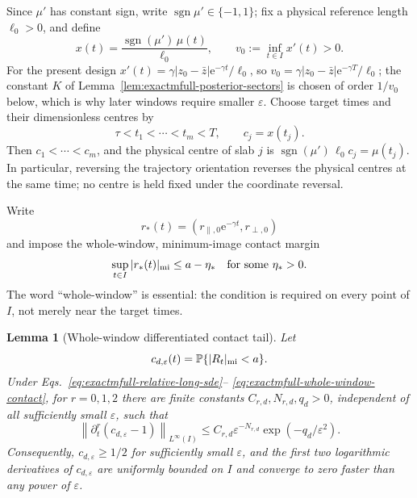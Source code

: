 \documentclass[aps,physrev,onecolumn,amsmath,amssymb,longbibliography]{revtex4-2}
\newcommand{\e}{\mathrm e}
\newtheorem{lemma}[theorem]{Lemma}
\begin{document}
Since \(\mu'\) has constant sign, write \(\operatorname{sgn}\mu'\in\{-1,1\}\);
fix a physical reference length \(\ell_0>0\), and define
\begin{equation}
 x(t)=\frac{\operatorname{sgn}(\mu')\,\mu(t)}{\ell_0},
 \qquad v_0:=\inf_{t\in I}x'(t)>0.
 \label{eq:exactmfull-increasing-coordinate}
\end{equation}
For the present design \(x'(t)=\gamma|z_0-\bar z|\e^{-\gamma t}/\ell_0\), so
\(v_0=\gamma|z_0-\bar z|\e^{-\gamma T}/\ell_0\); the constant \(K\) of
Lemma~\ref{lem:exactmfull-posterior-sectors} is chosen of order \(1/v_0\)
below, which is why later windows require smaller \(\varepsilon\).
Choose target times and their dimensionless centres by
\begin{equation}
 \tau<t_1<\cdots<t_m<T,
 \qquad c_j=x(t_j).
 \label{eq:exactmfull-targets}
\end{equation}
Then \(c_1<\cdots<c_m\), and the physical centre of slab \(j\) is
\(\operatorname{sgn}(\mu')\,\ell_0c_j=\mu(t_j)\).  In particular, reversing the trajectory
orientation reverses the physical centres at the same time; no centre is
held fixed under the coordinate reversal.

Write
\begin{equation}
 r_*(t)=(r_{\parallel,0}\e^{-\gamma t},r_{\perp,0})
 \label{eq:exactmfull-relative-deterministic-path}
\end{equation}
and impose the whole-window, minimum-image contact margin
\begin{equation}
 \sup_{t\in I}|r_*(t)|_{\rm mi}\le a-\eta_*
 \quad\text{for some }\eta_*>0.
 \label{eq:exactmfull-whole-window-contact}
\end{equation}
The word ``whole-window'' is essential: the condition is required on every
point of \(I\), not merely near the target times.

\begin{lemma}[Whole-window differentiated contact tail]
\label{lem:exactmfull-contact-tail}
Let
\begin{equation}
 c_{d,\varepsilon}(t)
 =\mathbb P\{|R_t|_{\rm mi}<a\}.
 \label{eq:exactmfull-contact-probability}
\end{equation}
Under Eqs.~\eqref{eq:exactmfull-relative-long-sde}--%
\eqref{eq:exactmfull-whole-window-contact}, for \(r=0,1,2\) there are finite
constants \(C_{r,d},N_{r,d},q_d>0\), independent of all sufficiently small
\(\varepsilon\), such that
\begin{equation}
 \left\|\partial_t^r(c_{d,\varepsilon}-1)\right\|_{L^\infty(I)}
 \le C_{r,d}\varepsilon^{-N_{r,d}}
       \exp(-q_d/\varepsilon^2).
 \label{eq:exactmfull-contact-tail-bound}
\end{equation}
Consequently, \(c_{d,\varepsilon}\ge1/2\) for sufficiently small
\(\varepsilon\), and the first two logarithmic derivatives of
\(c_{d,\varepsilon}\) are uniformly bounded on \(I\) and converge to zero
faster than any power of \(\varepsilon\).
\end{lemma}
\end{document}

